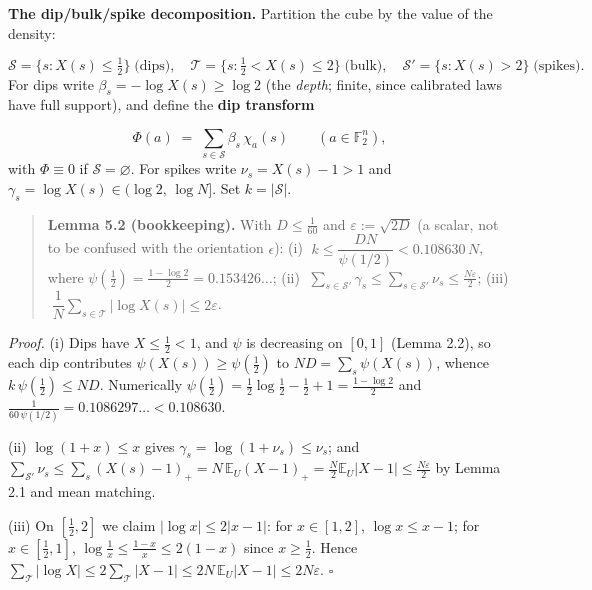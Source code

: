 \documentclass[11pt]{article}
\begin{document}
\textbf{The dip/bulk/spike decomposition.}  Partition the cube by the value of the density:

\[
\mathcal S = \{s : X(s) \le \tfrac12\} \;\text{(dips)},\quad
\mathcal T = \{s : \tfrac12 < X(s) \le 2\} \;\text{(bulk)},\quad
\mathcal S' = \{s : X(s) > 2\} \;\text{(spikes)}.
\]
For dips write $\beta_s = -\log X(s) \ge \log 2$ (the \emph{depth}; finite, since calibrated laws have full support), and define the \textbf{dip transform}

\[
\Phi(a) \;=\; \sum_{s \in \mathcal S} \beta_s\, \chi_a(s)
\qquad (a \in \mathbb{F}_2^n),
\]
with $\Phi \equiv 0$ if $\mathcal S = \varnothing$.  For spikes write $\nu_s = X(s) - 1 > 1$ and $\gamma_s = \log X(s) \in (\log 2,\, \log N]$.  Set $k = |\mathcal S|$.

\begin{quote}
\textbf{Lemma 5.2 (bookkeeping).}  With $D \le \frac1{60}$ and $\varepsilon := \sqrt{2D}$ (a scalar, not to be confused with the orientation $\epsilon$):  (i) $\;k \le \dfrac{DN}{\psi(1/2)} < 0.108630\,N$, where $\psi(\tfrac12) = \tfrac{1-\log 2}{2} = 0.153426\ldots$;  (ii) $\;\sum_{s \in \mathcal S'} \gamma_s \le \sum_{s\in\mathcal S'} \nu_s \le \tfrac{N\varepsilon}{2}$;  (iii) $\;\dfrac1N\sum_{s \in \mathcal T} |\log X(s)| \le 2\varepsilon$.
\end{quote}
\emph{Proof.}  (i) Dips have $X \le \frac12 < 1$, and $\psi$ is decreasing on $[0,1]$ (Lemma 2.2), so each dip contributes $\psi(X(s)) \ge \psi(\frac12)$ to $ND = \sum_s \psi(X(s))$, whence $k\,\psi(\tfrac12) \le ND$.  Numerically $\psi(\tfrac12) = \tfrac12\log\tfrac12 - \tfrac12 + 1 = \tfrac{1-\log2}{2}$ and $\frac{1}{60\,\psi(1/2)} = 0.1086297\ldots < 0.108630$.

(ii) $\log(1+x) \le x$ gives $\gamma_s = \log(1+\nu_s) \le \nu_s$; and $\sum_{\mathcal S'} \nu_s \le \sum_s (X(s)-1)_+ = N\,\mathbb{E}_U(X-1)_+ = \tfrac N2 \mathbb{E}_U|X-1| \le \tfrac{N\varepsilon}{2}$ by Lemma 2.1 and mean matching.

(iii) On $[\tfrac12, 2]$ we claim $|\log x| \le 2|x-1|$: for $x \in [1,2]$, $\log x \le x - 1$; for $x \in [\tfrac12, 1]$, $\log\tfrac1x \le \tfrac{1-x}{x} \le 2(1-x)$ since $x \ge \tfrac12$.  Hence $\sum_{\mathcal T}|\log X| \le 2\sum_{\mathcal T}|X-1| \le 2N\,\mathbb{E}_U|X-1| \le 2N\varepsilon$.  $\square$
\end{document}
